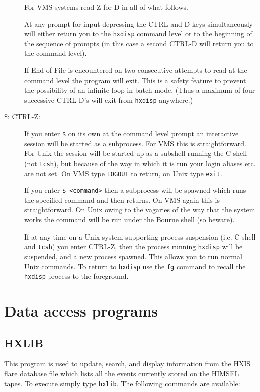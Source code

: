 \begin{description}
For VMS systems read Z for D in all of what follows.

At any prompt for input depressing the CTRL and D keys simultaneously
will either return you to the \verb!hxdisp! command level or to the
beginning of the sequence of prompts (in this case a second CTRL-D will
return you to the command level).

If End of File is encountered on two consecutive attempts to read at
the command level the program will exit. This is a safety feature to
prevent the possibility of an infinite loop in batch mode. (Thus a
maximum of four successive CTRL-D's will exit from \verb!hxdisp!
anywhere.)

\item[\$: CTRL-Z:] \label{dcl}

If you enter \verb!$! on its own at the command level prompt an
interactive session will be started as a subprocess. For VMS this is
straightforward. For Unix the session will be started up as a subshell
running the C-shell (not \verb!tcsh!), but because of the way in which
it is run your login aliases etc. are not set. On VMS type
\verb!LOGOUT! to return, on Unix type \verb!exit!.

If you enter \verb!$ <command>! then a subprocess will be spawned which
runs the specified command and then returns. On VMS again this is
straightforward. On Unix owing to the vagaries of the way that the
system works the command will be run under the Bourne shell (so beware).

If at any time on a Unix system supporting process suspension (i.e.
C-shell and \verb!tcsh!) you enter CTRL-Z, then the process running
\verb!hxdisp!  will be suspended, and a new process spawned. This
allows you to run normal Unix commands. To return to \verb!hxdisp! use
the \verb!fg!  command to recall the \verb!hxdisp! process to the
foreground.
\end{description}

\section{Data access programs}

\subsection{HXLIB}
\label{HXLIB}

This program is used to update, search, and display information from
the HXIS flare database file which lists all the events currently
stored on the HIMSEL tapes. To execute simply type \verb!hxlib!. The
following commands are available:

